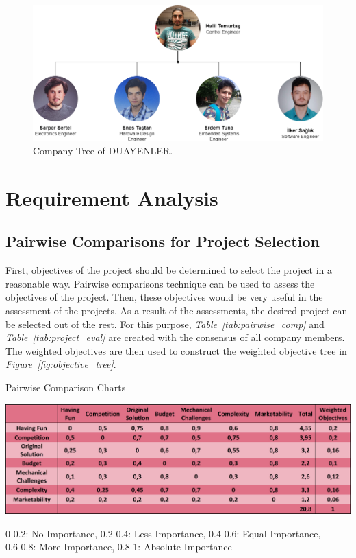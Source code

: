 \documentclass[a4paper,12pt]{article}
\begin{document}
\begin{figure}[t!]
	\centering
	\includegraphics[width=\textwidth,height=\textheight,keepaspectratio]{../../Documents/company/company-tree} 
	\caption{\label{fig:company_tree}Company Tree of DUAYENLER.}
\end{figure}


\newpage

\section{Requirement Analysis}
	
	\subsection{Pairwise Comparisons for Project Selection}
		First, objectives of the project should be determined to select the project in a reasonable way. Pairwise comparisons technique can be used to assess the objectives of the project. Then, these objectives would be very useful in the assessment of the projects. As a result of the assessments, the desired project can be selected out of the rest. For this purpose, \textit{Table~\ref{tab:pairwise_comp}} and \textit{Table~\ref{tab:project_eval}} are created with the consensus of all company members. The weighted objectives are then used to construct the weighted objective tree in \textit{Figure~\ref{fig:objective_tree}}. 
		


	\begin{table}[H]
		\centering
		\caption{\label{tab:pairwise_comp}Pairwise Comparison Charts}\vspace{-.2cm}
		\includegraphics[width=\textwidth]{images/objective_tree3} 
	\vspace*{-.9cm}	\begin{center}
		{\small 0-0.2: No Importance, 0.2-0.4: Less Importance, 0.4-0.6: Equal Importance,\\ 0.6-0.8: More Importance, 0.8-1: Absolute Importance }	
		\end{center}
	\end{table}	\vspace*{-.5cm}	
	
\end{document}
